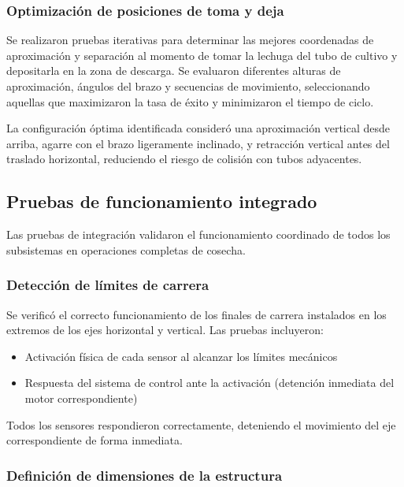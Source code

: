\subsubsection{Optimización de posiciones de toma y deja}

Se realizaron pruebas iterativas para determinar las mejores coordenadas de aproximación y separación al momento de tomar la lechuga del tubo de cultivo y depositarla en la zona de descarga. Se evaluaron diferentes alturas de aproximación, ángulos del brazo y secuencias de movimiento, seleccionando aquellas que maximizaron la tasa de éxito y minimizaron el tiempo de ciclo.

La configuración óptima identificada consideró una aproximación vertical desde arriba, agarre con el brazo ligeramente inclinado, y retracción vertical antes del traslado horizontal, reduciendo el riesgo de colisión con tubos adyacentes.

\subsection{Pruebas de funcionamiento integrado}

Las pruebas de integración validaron el funcionamiento coordinado de todos los subsistemas en operaciones completas de cosecha.

\subsubsection{Detección de límites de carrera}

Se verificó el correcto funcionamiento de los finales de carrera instalados en los extremos de los ejes horizontal y vertical. Las pruebas incluyeron:

\begin{itemize}[label=$\bullet$]
    \item Activación física de cada sensor al alcanzar los límites mecánicos
    \item Respuesta del sistema de control ante la activación (detención inmediata del motor correspondiente)
\end{itemize}

Todos los sensores respondieron correctamente, deteniendo el movimiento del eje correspondiente de forma inmediata.

\subsubsection{Definición de dimensiones de la estructura}

